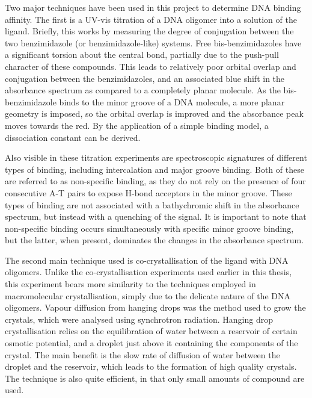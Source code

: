 \begin{refsection}
Two major techniques have been used in this project to determine DNA binding affinity.
The first is a UV-vis titration of a DNA oligomer into a solution of the ligand.
Briefly, this works by measuring the degree of conjugation between the two benzimidazole (or benzimidazole-like) systems.
Free bis-benzimidazoles have a significant torsion about the central bond, partially due to the push-pull character of these compounds.
This leads to relatively poor orbital overlap and conjugation between the benzimidazoles, and an associated blue shift in the absorbance spectrum as compared to a completely planar molecule.
As the bis-benzimidazole binds to the minor groove of a DNA molecule, a more planar geometry is imposed, so the orbital overlap is improved and the absorbance peak moves towards the red.
By the application of a simple binding model, a dissociation constant can be derived.

Also visible in these titration experiments are spectroscopic signatures of different types of binding, including intercalation and major groove binding.
Both of these are referred to as non-specific binding, as they do not rely on the presence of four consecutive A-T pairs to expose H-bond acceptors in the minor groove.
These types of binding are not associated with a bathychromic shift in the absorbance spectrum, but instead with a quenching of the signal.
It is important to note that non-specific binding occurs simultaneously with specific minor groove binding, but the latter, when present, dominates the changes in the absorbance spectrum.

The second main technique used is co-crystallisation of the ligand with DNA oligomers.
Unlike the co-crystallisation experiments used earlier in this thesis, this experiment bears more similarity to the techniques employed in macromolecular crystallisation, simply due to the delicate nature of the DNA oligomers.
Vapour diffusion from hanging drops was the method used to grow the crystals, which were analysed using synchrotron radiation.
Hanging drop crystallisation relies on the equilibration of water between a reservoir of certain osmotic potential, and a droplet just above it containing the components of the crystal.
The main benefit is the slow rate of diffusion of water between the droplet and the reservoir, which leads to the formation of high quality crystals.
The technique is also quite efficient, in that only small amounts of compound are used.


\end{refsection}
